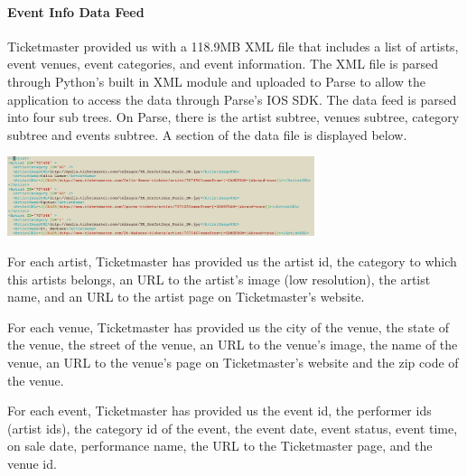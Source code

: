 		       \paragraph{Event Info Data Feed}
		       Ticketmaster provided us with a 118.9MB XML file that includes a list of artists, event venues, event 
		       categories, and event information. The XML file is parsed through Python’s built in XML module and 
		       uploaded to Parse to allow the application to access the data through Parse’s IOS SDK. The data feed 
		       is parsed into four sub trees. On Parse, there is the artist subtree, venues subtree, category subtree 
		       and events subtree. A section of the data file is displayed below. 
		       	\begin{center}
		       		\includegraphics[width=90mm]{./pics/xml1.png}
		       	\end{center}
		       	For each artist, Ticketmaster has provided us the artist id, the category to which this artists 
		       	belongs, an URL to the artist’s image (low resolution), the artist name, and an URL to the artist page 
		       	on Ticketmaster’s website.
		       	
		       	For each venue, Ticketmaster has provided us the city of the venue, the state of the venue, the 
		       	street of the venue, an URL to the venue’s image, the name of the venue, an URL to the venue’s page 
		       	on Ticketmaster’s website and the zip code of the venue.
		       	
		       	For each event, Ticketmaster has provided us the event id, the performer ids (artist ids), the 
		       	category id of the event, the event date, event status, event time, on sale date, performance name, 
		       	the URL to the Ticketmaster page, and the venue id.
		       	
